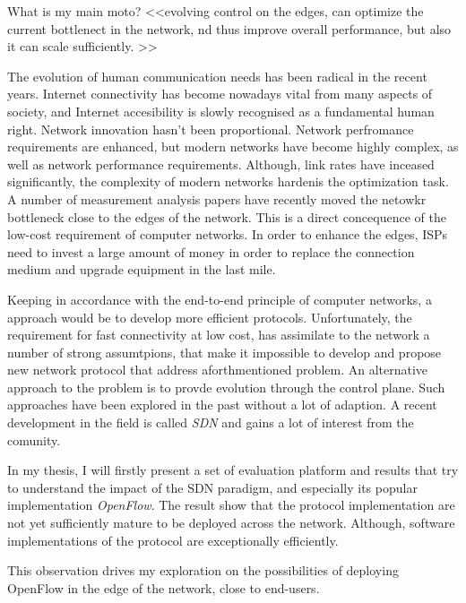 


\begin{abstracts}        %

What is my main moto? <<evolving control on the edges, can optimize the current
bottlenect in the network, nd thus improve overall performance, but also it can
scale sufficiently. >>

The evolution of human communication needs has been radical in the recent years.
Internet connectivity has become nowadays vital from many aspects of society, 
and Internet accesibility is slowly recognised as a fundamental human right. 
Network innovation hasn't been proportional. Network perfromance requirements
are enhanced, but modern networks have become highly complex, as well as 
network performance requirements. 
Although, link rates have inceased significantly, the complexity of modern 
networks hardenis the optimization task. A number of measurement analysis papers
have recently moved the netowkr bottleneck close to the edges of the network. 
This is a direct concequence of the low-cost requirement of computer networks. 
In order to enhance the edges, ISPs need to invest a large amount of money 
in order to replace the connection medium and upgrade equipment in the last 
mile. 

Keeping in accordance with the  end-to-end principle of computer networks, a 
approach would be to develop more efficient protocols. Unfortunately, 
the requirement for fast connectivity at low cost, has assimilate to the network
a number of 
strong assumtpions, that make it impossible to develop and propose new network
protocol that address aforthmentioned problem. An alternative approach to the 
problem is to provde evolution through the control plane. Such approaches have
been explored in the past without a lot of adaption. A recent development in the 
field is called {\it SDN} and gains a lot of interest from the comunity. 

In my thesis, I will firstly present a set of evaluation platform and results
that try to understand the impact of the SDN paradigm, and especially its popular
implementation {\it OpenFlow}. The result show that the protocol implementation are not yet sufficiently mature to be deployed across the network. Although, 
software implementations of the protocol are exceptionally efficiently. 

This observation drives my exploration on the possibilities of deploying 
OpenFlow in the edge of the network, close to end-users. 




\end{abstracts}




